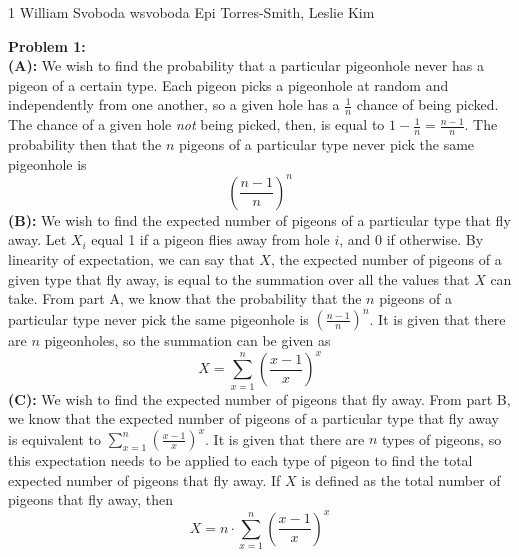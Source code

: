 \documentclass[12pt,letterpaper]{cos340hw}
\begin{document}
           {1}            %
           {William Svoboda}  %
           {wsvoboda}   %
           {Epi Torres-Smith, Leslie Kim} 




\noindent\textbf{Problem 1:}\\
\noindent\textbf{(A):} We wish to find the probability that a particular pigeonhole never has a pigeon of 
a certain type. Each pigeon picks a pigeonhole at random and independently from one another, so a 
given hole has a $\frac{1}{n}$ chance of being picked. The chance of a given hole \emph{not} being 
picked, then, is equal to $1-\frac{1}{n}=\frac{n-1}{n}$. The probability then that the $n$ pigeons of a 
particular type never pick the same pigeonhole is
$$(\frac{n-1}{n})^n$$
\noindent\textbf{(B):} We wish to find the expected number of pigeons of a particular type that fly away. 
Let $X_i$ equal 1 if a pigeon flies away from hole $i$, and 0 if otherwise. By linearity of expectation, 
we can say that $X$, the expected number of pigeons of a given type that fly away, is equal to the 
summation over all the values that $X$ can take. From part A, we know that the probability that the $n$ 
pigeons of a particular type never pick the same pigeonhole is $(\frac{n-1}{n})^n$. It is given that there 
are $n$ pigeonholes, so the summation can be given as 
$$X=\sum_{x=1}^{n}(\frac{x-1}{x})^x$$
\noindent\textbf{(C):} We wish to find the expected number of pigeons that fly away. From part B, we 
know that the expected number of pigeons of a particular type that fly away is equivalent to 
$\sum_{x=1}^{n}(\frac{x-1}{x})^x$. It is given that there are $n$ types of pigeons, so this expectation 
needs to be applied to each type of pigeon to find the total expected number of pigeons that fly 
away. If $X$ is defined as the total number of pigeons that fly away, then
$$X=n\cdot\sum_{x=1}^{n}(\frac{x-1}{x})^x$$


\end{document}
